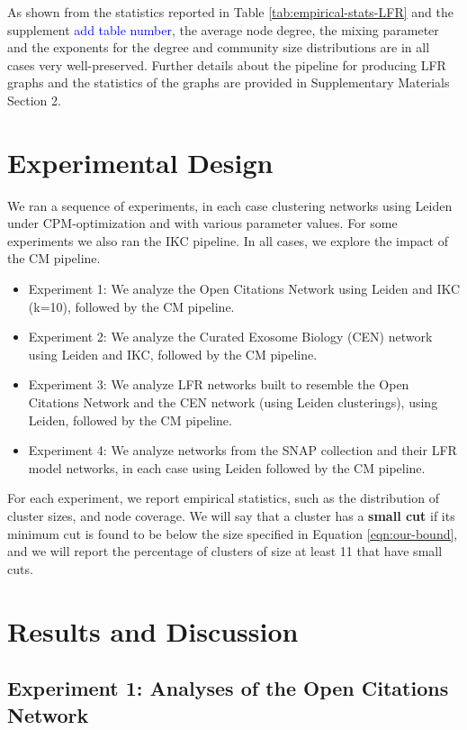 \documentclass[11pt]{article}   	%
\begin{document}
As shown from the statistics reported in Table \ref{tab:empirical-stats-LFR} and the supplement \textcolor{blue}{add table number}, the average node degree, the mixing parameter and the exponents for the degree and community size distributions are in all cases very well-preserved. Further details about the pipeline for producing LFR graphs and the statistics of the graphs are provided in Supplementary Materials Section 2.

\section{Experimental Design}
\label{sec:expt-design}
We ran a sequence of experiments, in each case clustering networks using Leiden under CPM-optimization and with various parameter values. For some experiments we also ran the IKC pipeline.  In all cases, we explore the impact of the CM pipeline.
\begin{itemize}
\item Experiment 1: We analyze the Open Citations Network using Leiden  and IKC (k=10), followed by the CM pipeline.
\item Experiment 2: We analyze the Curated Exosome Biology (CEN) network using Leiden and IKC, followed by the CM pipeline.
\item Experiment 3: We analyze LFR networks built to resemble the Open Citations Network and the CEN network (using Leiden clusterings), using Leiden, followed by the CM pipeline.
\item Experiment 4: We analyze networks from the SNAP collection and their LFR model networks, in each case using Leiden followed by the CM pipeline.
\end{itemize}

For each experiment, we report empirical statistics, such as the distribution of cluster sizes, and node  coverage.   
We will say that a cluster has a {\bf small cut} if its minimum cut is found to be below  the size specified in
 Equation \ref{eqn:our-bound}, and we will report the percentage of clusters of size at least 11 that have small cuts.


\section{Results and Discussion}
\label{sec:results-discussion}

\subsection{Experiment 1: Analyses of the Open Citations Network}
\end{document}
